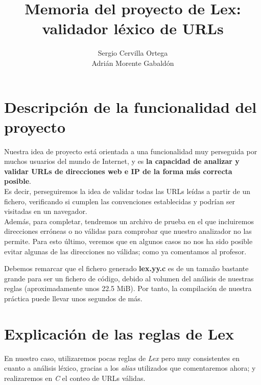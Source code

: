 \documentclass[]{scrartcl}
\title{Memoria del proyecto de Lex: validador léxico de URLs}
\author{Sergio Cervilla Ortega \\ Adrián Morente Gabaldón}
\begin{document}
\maketitle

\section{Descripción de la funcionalidad del proyecto}
  Nuestra idea de proyecto está orientada a una funcionalidad muy perseguida por muchos usuarios del mundo de Internet, y es \textbf{la capacidad de analizar y validar URLs de direcciones web e IP de la forma más correcta posible}. \\
  Es decir, perseguiremos la idea de validar todas las URLs leídas a partir de un fichero, verificando si cumplen las convenciones establecidas y podrían ser visitadas en un navegador. \\
  
  Además, para completar, tendremos un archivo de prueba en el que incluiremos direcciones erróneas o no válidas para comprobar que nuestro analizador no las permite. Para esto último, veremos que en algunos casos no nos ha sido posible evitar algunas de las direcciones no válidas; como ya comentamos al profesor. 
  
  \vspace{6mm} 
  
  Debemos remarcar que el fichero generado \textbf{lex.yy.c} es de un tamaño bastante grande para ser un fichero de código, debido al volumen del análisis de nuestras reglas (aproximadamente unos 22.5 MiB). Por tanto, la compilación de nuestra práctica puede llevar unos segundos de más.

\section{Explicación de las reglas de Lex}
  En nuestro caso, utilizaremos pocas reglas de \emph{Lex} pero muy consistentes en cuanto a análisis léxico, gracias a los \emph{alias} utilizados que comentaremos ahora; y realizaremos en \emph{C} el conteo de URLs válidas.
  
\end{document}
